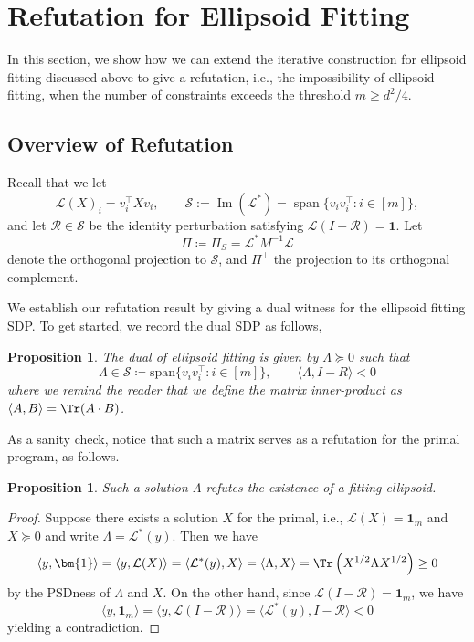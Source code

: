\documentclass[12pt]{article}
\def\1{\bm{1}}
\newtheorem{proposition}[theorem]{Proposition}
\newcommand{\calR}{\mathcal{R}}
\newcommand{\calS}{\mathcal{S}}
\newcommand{\calL}{\mathcal{L}}
\begin{document}
%


\section{Refutation for Ellipsoid Fitting}
\label{sec:refutation}
In this section, we show how we can extend the iterative construction for ellipsoid fitting discussed above to give a refutation, i.e., the impossibility of ellipsoid fitting, when the number of constraints exceeds the threshold $m \ge d^2/4$.

\subsection{Overview of Refutation}
Recall that we let
\[
\mathcal L(X)_i= v_i^\top Xv_i ,
\qquad
\mathcal S:=\operatorname{Im}(\mathcal L^*)
=\operatorname{span}\{v_iv_i^\top:i\in[m]\},
\]
and let \(\calR\in\mathcal S\) be the identity perturbation satisfying
\(
\mathcal L(I-\calR)=\mathbf 1.
\)
Let \[ \Pi \coloneqq \Pi_S  = \calL^*M^{-1}\calL \] denote the orthogonal projection to $\calS$, and $\Pi^\perp$ the projection to its orthogonal complement.

We establish our refutation result by giving a dual witness for the ellipsoid fitting SDP. To get started, we record the dual SDP as follows,
\begin{proposition}\label{def:refutation-sdp}
	The dual of ellipsoid fitting is given by \(
	\Lambda \succeq 0
	\)
	such that \[ 
	\Lambda \in \calS \coloneqq \text{span}\{v_iv_i^\top: i\in [m] \}, \qquad \langle \Lambda, I-R\rangle < 0
	\]
where we remind the reader that we define the matrix inner-product as $\langle A,B\rangle = \Tr(A\cdot B)$.
\end{proposition}
As a sanity check, notice that such a matrix serves as a refutation for the primal program, as follows.
\begin{proposition}
Such a solution $\Lambda$ refutes the existence of a fitting ellipsoid.	
\end{proposition}
\begin{proof}
	Suppose there exists a solution $X$ for the primal, i.e., $\calL(X)=\1_m$ and $X\succeq 0$ and write $\Lambda = \calL^*(y)$. Then we have \[
  \langle y, \1 \rangle = \langle y, \calL(X)\rangle = \langle \calL^*(y), X \rangle =   \langle \Lambda, X\rangle =\Tr \left( X^{1/2} \Lambda X^{1/2}\right) \geq 0
\]
 by the PSDness of $\Lambda$ and $X$. On the other hand, since $\calL(I-\calR)=\1_m$,  we have \[
\langle y, \1_m \rangle = \langle y, \calL(I-\calR)\rangle = \langle \calL^*(y), I-\calR\rangle <0 
 \]
 yielding a contradiction.
\end{proof}
\end{document}
